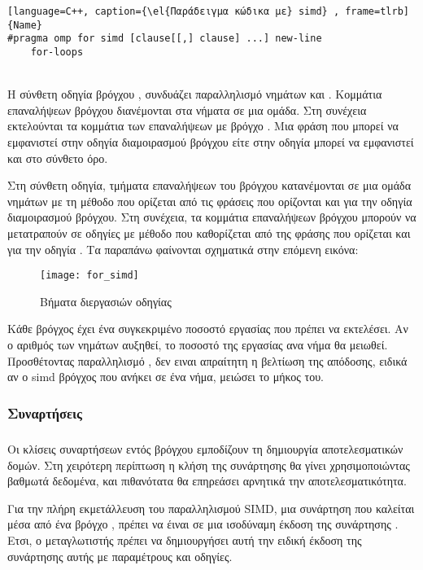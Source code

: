 \begin{lstlisting}[language=C++, caption={\el{Παράδειγμα κώδικα με} simd} , frame=tlrb]{Name}
#pragma omp for simd [clause[[,] clause] ...] new-line
	for-loops
\end{lstlisting}

\ \\
Η σύνθετη οδηγία βρόγχου \emph{}, συνδυάζει παραλληλισμό νημάτων και \emph{}. Κομμάτια επαναλήψεων βρόγχου διανέμονται στα νήματα σε μια ομάδα. Στη συνέχεια εκτελούνται τα κομμάτια των επαναλήψεων με βρόγχο \emph{}. Μια φράση που μπορεί να εμφανιστεί στην οδηγία διαμοιρασμού βρόγχου είτε στην οδηγία \emph{} μπορεί να εμφανιστεί και στο σύνθετο όρο.

Στη σύνθετη οδηγία, τμήματα επαναλήψεων του βρόγχου κατανέμονται σε μια ομάδα νημάτων με τη μέθοδο που ορίζεται από τις φράσεις που ορίζονται και για την οδηγία διαμοιρασμού βρόγχου. Στη συνέχεια, τα κομμάτια επαναλήψεων βρόγχου μπορούν να μετατραπούν σε οδηγίες \emph{} με μέθοδο που καθορίζεται από της φράσης που ορίζεται και για την οδηγία \emph{}. Τα παραπάνω φαίνονται σχηματικά στην επόμενη εικόνα:
\ \\
\begin{figure}[h]
\texttt{[image: for\_simd]}
\centering
\captionsetup{justification=centering, singlelinecheck=false}
	\caption{ Βήματα διεργασιών οδηγίας \emph{}}
\label{fig:for_simd}
\end{figure}

Κάθε βρόγχος έχει ένα συγκεκριμένο ποσοστό εργασίας που πρέπει να εκτελέσει. Αν ο αριθμός των νημάτων αυξηθεί, το ποσοστό της εργασίας ανα νήμα θα μειωθεί. Προσθέτοντας παραλληλισμό \emph{}, δεν ειναι απραίτητη η βελτίωση της απόδοσης, ειδικά αν ο simd βρόγχος που ανήκει σε ένα νήμα, μειώσει το μήκος του.
\clearpage{}
\subsubsection{Συναρτήσεις \emph{}}
\subparagraph{}
Οι κλίσεις συναρτήσεων εντός βρόγχου \emph{} εμποδίζουν τη δημιουργία αποτελεσματικών \emph{} δομών. Στη χειρότερη περίπτωση η κλήση της συνάρτησης θα γίνει χρησιμοποιώντας βαθμωτά δεδομένα, και πιθανότατα θα επηρεάσει αρνητικά την αποτελεσματικότητα.

Για την πλήρη εκμετάλλευση του παραλληλισμού SIMD, μια συνάρτηση που καλείται μέσα από ένα βρόγχο \emph{}, πρέπει να έιναι σε μια ισοδύναμη έκδοση  της συνάρτησης \emph{}. Ετσι, ο μεταγλωτιστής πρέπει να δημιουργήσει αυτή την ειδική έκδοση της συνάρτησης αυτής με \emph{} παραμέτρους και οδηγίες.

